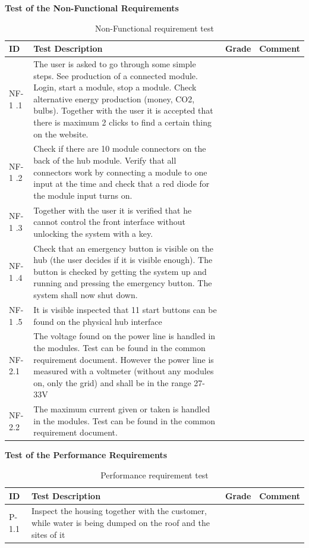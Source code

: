 \textbf{Test of the Non-Functional Requirements}
\begin{table}[H]
	\begin{tabular} [b] {| p{1.2cm} |  p{9.3cm} | p{1.2cm} | p{3.8cm} |}
	\hline
	\textbf{ID} & \textbf{Test Description} & \textbf{Grade} & \textbf{Comment} \\\hline
		NF-1	.1	& The user is asked to go through some simple steps. See production of a connected module. Login, start a module, stop a module. Check alternative energy production (money, CO2, bulbs).	Together with the user it is accepted that there is maximum 2 clicks to find a  certain thing on the website. &	&\\ \hline
		NF-1	.2	& Check if there are 10 module connectors on the back of the hub module. Verify that all connectors work by connecting a module to one input at the time and check that a red diode for the module input turns on. 	&	&\\ \hline
		NF-1	.3	& Together with the user it is verified that he cannot control the front interface without unlocking the system with a key. 	&	&\\ \hline
		NF-1	.4	& Check that an emergency button is visible on the hub (the user decides if it is visible enough). The button is checked by getting the system up and running and pressing the emergency button. The system shall now shut down.	&	&\\ \hline
		NF-1	.5	& It is visible inspected that 11 start buttons can be found on the physical hub interface	&	&\\ \hline
		NF-2.1	& The voltage found on the power line is handled in the modules. Test can be found in the common requirement document. However the power line is measured with a voltmeter (without any modules on, only the grid) and shall be in the range 27-33V	&	&\\ \hline
		NF-2.2	& The maximum current given or taken is handled in the modules. Test can be found in the common requirement document.	&	&\\ \hline
	\end{tabular}
	\caption{Non-Functional requirement test}
\end{table}
\textbf{Test of the Performance Requirements}
\begin{table}[H]
	\begin{tabular} [b] {| p{1.2cm} |  p{9.3cm} | p{1.2cm} | p{3.8cm} |}
	\hline
	\textbf{ID} & \textbf{Test Description} & \textbf{Grade} & \textbf{Comment} \\\hline
		P-1.1	& Inspect the housing together with the customer, while water is being dumped on the roof and the sites of it &	&\\ \hline
	\end{tabular}
	\caption{Performance requirement test}
\end{table}
